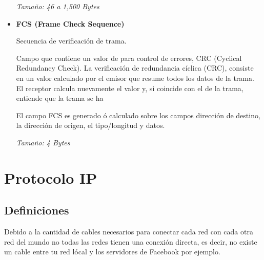\documentclass[12pt, fleqn]{report}                             %
\theoremstyle{break}                                            %
\begin{document}
\begin{itemize}
                        \emph{Tamaño: 46 a 1,500 Bytes} 


                    \item
                        \textbf{FCS (Frame Check Sequence)}

                        Secuencia de verificación de trama. 

                        Campo que contiene un valor de para control de errores, CRC (Cyclical Redundancy Check).
                        La verificación de redundancia cíclica (CRC), consiste en un valor calculado por el emisor que resume todos
                        los datos de la trama.
                        El receptor calcula nuevamente el valor y, si coincide con el de la trama, entiende que la trama se ha

                        El campo FCS es generado ó calculado sobre los campos dirección de destino, la dirección de origen,
                        el tipo/longitud y datos. 
                        
                        \emph{Tamaño: 4 Bytes} 

                \end{itemize}





    \chapter{Protocolo IP}


        \clearpage
        \section{Definiciones}

            Debido a la cantidad de cables necesarios para conectar cada red con cada otra red del mundo
            no todas las redes tienen una conexión directa, es decir, no existe un cable entre tu red
            lócal y los servidores de Facebook por ejemplo.
\end{document}
